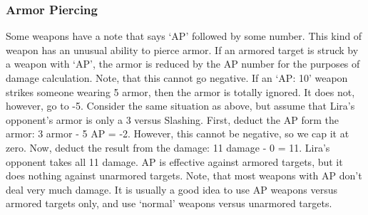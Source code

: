 \documentclass[twoside]{book}
\begin{document}
\subsubsection{Armor Piercing}
     Some weapons have a note that says
                 `AP' followed by some number. This kind of
                 weapon has an unusual ability to pierce armor. If an
                 armored target is struck by a weapon with
                 `AP', the armor is reduced by the AP number
                 for the purposes of damage calculation. Note, that this
                 cannot go negative. If an `AP: 10' weapon
                 strikes someone wearing 5 armor, then the armor is
                 totally ignored. It does not, however, go to -5. 
    Consider the same situation as above, but assume
                 that Lira's opponent's armor is only a 3
                 versus Slashing. First, deduct the AP form the armor: 3
                 armor - 5 AP = -2. However, this cannot be negative, so
                 we cap it at zero. Now, deduct the result from the
                 damage: 11 damage - 0 = 11. Lira's opponent takes
                 all 11 damage.  AP is effective against armored targets, but it
                 does nothing against unarmored targets. Note, that most
                 weapons with AP don't deal very much damage. It is
                 usually a good idea to use AP weapons versus armored
                 targets only, and use `normal' weapons
                 versus unarmored targets. 
\end{document}
